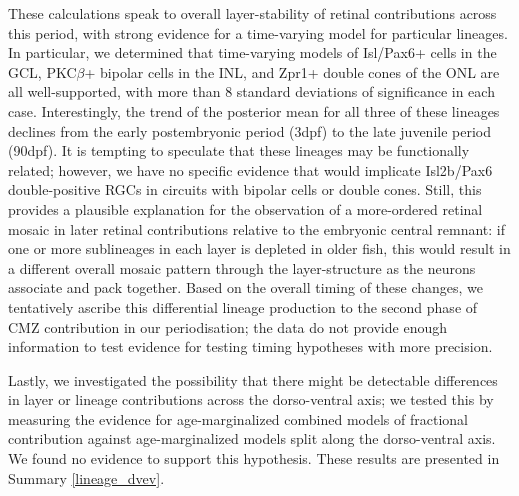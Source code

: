 These calculations speak to overall layer-stability of retinal contributions across this period, with strong evidence for a time-varying model for particular lineages. In particular, we determined that time-varying models of Isl/Pax6+ cells in the GCL, PKC$\beta$+ bipolar cells in the INL, and Zpr1+ double cones of the ONL are all well-supported, with more than 8 standard deviations of significance in each case. Interestingly, the trend of the posterior mean for all three of these lineages declines from the early postembryonic period (3dpf) to the late juvenile period (90dpf). It is tempting to speculate that these lineages may be functionally related; however, we have no specific evidence that would implicate Isl2b/Pax6 double-positive RGCs in circuits with bipolar cells or double cones. Still, this provides a plausible explanation for the observation of a more-ordered retinal mosaic in later retinal contributions relative to the embryonic central remnant: if one or more sublineages in each layer is depleted in older fish, this would result in a different overall mosaic pattern through the layer-structure as the neurons associate and pack together. Based on the overall timing of these changes, we tentatively ascribe this differential lineage production to the second phase of CMZ contribution in our periodisation; the data do not provide enough information to test evidence for testing timing hypotheses with more precision.

Lastly, we investigated the possibility that there might be detectable differences in layer or lineage contributions across the dorso-ventral axis; we tested this by measuring the evidence for age-marginalized combined models of fractional contribution against age-marginalized models split along the dorso-ventral axis. We found no evidence to support this hypothesis. These results are presented in Summary \autoref{lineage_dvev}.

\FloatBarrier

